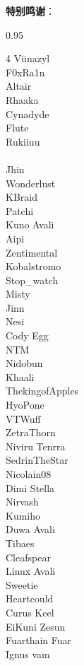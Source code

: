 {{\textbf{特别鸣谢}：}
\begin{spacing}{0.95}
	\setlength{\multicolsep}{1ex}
	\begin{multicols}{4}
		Viinazyl \\
		F0xRa1n \\
		Altair \\
		Rhaaka \\
		Cynadyde \\
		Flute \\
		Rukiiuu \\
		 \\
		Jhin \\
		Wonderlust \\
		K\textquotesingle{}Braid \\
		Patchi \\
		Kuno Avali \\
		Aipi \\
		Zentimental \\
		Kobalstromo \\
		Stop\_watch \\
		Misty \\
		Jinn \\
		Nesi \\
		Cody Egg \\
		NTM \\
		Nidobun \\
		Khaali \\
		ThekingofApples \\
		HyoPone \\
		VTWuff \\
		ZetraThorn \\
		Niviru Tenrra \\
		SedrinTheStar \\
		Nicolain08 \\
		Dimi Stella \\
		Nirvash \\
		Kumiho \\
		Duwa Avali \\
		Tibaes \\
		Cleafspear \\
		Linux Avali \\
		Sweetie \\
		Heartcould \\
		Curus Keel \\
		Ei\textquotesingle{}Kuni Zesun \\
		Fuarthain Fuar \\
		Ignus vam \\

\end{multicols}
\end{spacing}}

